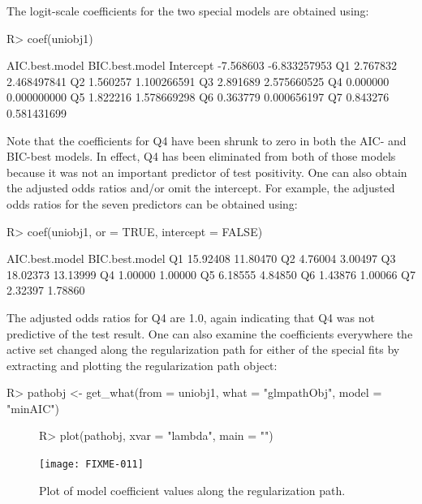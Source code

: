 \documentclass[11pt]{report}
\renewenvironment{Schunk}{\vspace{\topsep}}{\vspace{\topsep}}
\begin{document}
The logit-scale coefficients for the two special models
are obtained using:
\begin{Schunk}
\begin{Sinput}
R> coef(uniobj1)
\end{Sinput}
\begin{Soutput}
          AIC.best.model BIC.best.model
Intercept      -7.568603   -6.833257953
Q1              2.767832    2.468497841
Q2              1.560257    1.100266591
Q3              2.891689    2.575660525
Q4              0.000000    0.000000000
Q5              1.822216    1.578669298
Q6              0.363779    0.000656197
Q7              0.843276    0.581431699
\end{Soutput}
\end{Schunk}
Note that the coefficients for Q4 have been shrunk to zero in both the
AIC- and BIC-best models. In effect, Q4 has been eliminated from both
of those models because it was not an important predictor of test
positivity. One can also obtain the adjusted odds ratios and/or omit the
intercept.  For example, the adjusted odds ratios for the seven
predictors can be obtained using:
\begin{Schunk}
\begin{Sinput}
R> coef(uniobj1, or = TRUE, intercept = FALSE)
\end{Sinput}
\begin{Soutput}
   AIC.best.model BIC.best.model
Q1       15.92408       11.80470
Q2        4.76004        3.00497
Q3       18.02373       13.13999
Q4        1.00000        1.00000
Q5        6.18555        4.84850
Q6        1.43876        1.00066
Q7        2.32397        1.78860
\end{Soutput}
\end{Schunk}
The adjusted odds ratios for Q4 are 1.0, again indicating that Q4 was
not predictive of the test result.  One can also examine the
coefficients everywhere the active set changed along the
regularization path for either of the special fits by extracting and
plotting the regularization path object:
\begin{Schunk}
\begin{Sinput}
R> pathobj <- get_what(from = uniobj1, what = "glmpathObj", model = "minAIC")
\end{Sinput}
\end{Schunk}
\begin{figure}[!h]
  \begin{center}
\begin{Schunk}
\begin{Sinput}
R> plot(pathobj, xvar = "lambda", main = "")
\end{Sinput}
\end{Schunk}
\texttt{[image: FIXME-011]}
\caption{Plot of model coefficient values along the regularization
  path.}
\label{fig:f1}
\end{center}
\end{figure}
\end{document}

